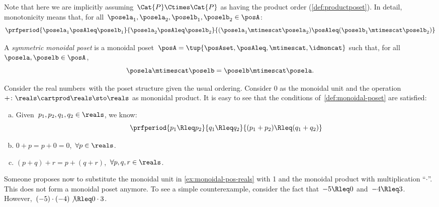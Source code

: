 Note that here we are implicitly assuming~$\Cat{P} \Ctimes \Cat{P}$ as having the product order (\cref{def:productposet}).
In detail, monotonicity means that, for all~$\posela_1, \posela_2, \poselb_1, \poselb_2 \in \posA$:
\begin{equation}
    \prfperiod{\posela_1 \posAleq \poselb_1}{\posela_2 \posAleq \poselb_2}{ (\posela_1 \mtimescat  \posela_2) \posAleq  (\poselb_1 \mtimescat  \poselb_2)}
\end{equation}

\begin{ctdefinition}
    \label{def:sym-monoidal-poset}
    A \emph{symmetric monoidal poset} is a monoidal poset~$\posA=\tup{\posAset, \posAleq, \mtimescat, \idmoncat}$ such that, for all~$\posela, \poselb \in \posA$,
    \begin{equation}
        \posela \mtimescat \poselb = \poselb \mtimescat \posela.
    \end{equation}
\end{ctdefinition}

\begin{example}
    \label{ex:monoidal-pos-reals}
    Consider the real numbers~\reals with the poset structure given the usual ordering.
    Consider 0 as the monoidal unit and the operation~$+\colon \reals\cartprod \reals\sto \reals$ as mononidal product.
    It is easy to see that the conditions of~\cref{def:monoidal-poset} are satisfied:
    \begin{enumerate}[(a)]
        \item Given~$p_1,p_2,q_1,q_2\in \reals$, we know:
              \begin{equation*}
                  \prfperiod{
                      p_1\Rleq  p_2
                  }{
                      q_1\Rleq  q_2
                  }{
                      (p_1+p_2) \Rleq  (q_1+q_2)
                  }
              \end{equation*}
        \item $0+p=p+0=0$,~$\forall p\in \reals$.
        \item $(p+q)+r=p+(q+r)$,~$\forall p,q,r\in \reals$.
    \end{enumerate}
\end{example}

\begin{counterexample}
    Someone proposes now to substitute the monoidal unit in \cref{ex:monoidal-pos-reals} with 1 and the monoidal product with multiplication ``$\cdot$''.
    This does not form a monoidal poset anymore.
    To see a simple counterexample, consider the fact that~$-5\Rleq 0$ and~$-4\Rleq 3$.
    However,~$(-5)\cdot (-4) \not{\Rleq} 0 \cdot 3$.
\end{counterexample}

